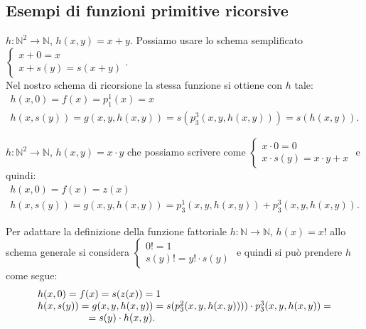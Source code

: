 \subsection{Esempi di funzioni primitive ricorsive}

\begin{esempio}[somma]
$h:\mathbb{N}^2 \to \mathbb{N}$, $h(x,y)=x+y$.
Possiamo usare lo schema semplificato
$\left\{ \begin{array}{ll}
	x+0=x\\
	x+s(y)=s(x+y)
\end{array}\right.$.\\
Nel nostro schema di ricorsione la stessa funzione si ottiene con $h$
tale:\newline
$$\begin{array}{ll}
	h(x,0)=f(x)=p_1^1(x)=x\\
	h(x,s(y))=g(x,y,h(x,y))=s(p_3^3(x,y,h(x,y)))=s(h(x,y)).
\end{array}$$\newline
\end{esempio}
%
\begin{esempio}[prodotto]

 $h:\mathbb{N}^2 \to \mathbb{N}$, $h(x,y)=x \cdot y$ che possiamo scrivere
come
$\left\{ \begin{array}{ll}
	x \cdot 0=0\\
	x \cdot s(y)= x \cdot y + x
\end{array}\right.$ e quindi: \newline
$$\begin{array}{ll}
	h(x,0)=f(x)=z(x)\\
	h(x,s(y))=g(x,y,h(x,y))=p_3^1(x,y,h(x,y))+p_3^3(x,y,h(x,y)).
\end{array}$$\newline
\end{esempio}
%
\begin{esempio}[fattoriale] Per adattare la definizione della funzione
fattoriale
$h:\mathbb{N} \to \mathbb{N}$, $h(x)=x!$ allo schema generale si considera
$\left\{ \begin{array}{ll}
	0!=1\\
	s(y)! = y! \cdot s(y)
\end{array}\right.$ e quindi si pu\`o prendere $h$ come segue: \newline
$$\begin{array}{ll}
	h(x,0)=f(x)=s(z(x))=1\\
	h(x,s(y))=g(x,y,h(x,y))= s(p_3^2(x,y,h(x,y)))) \cdot p_3^3(x,y,h(x,y))=
\\
	\hspace{1.8cm} = s(y)\cdot h(x,y).
	\end{array}$$\newline
\end{esempio}
